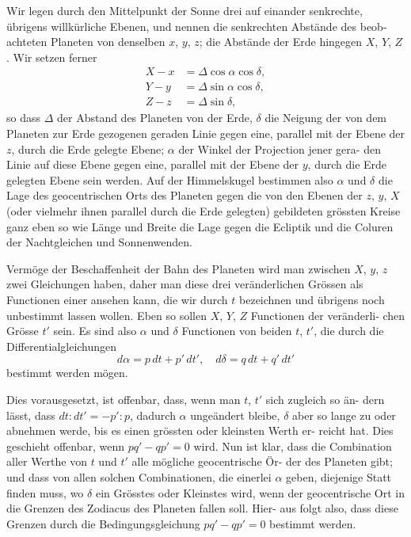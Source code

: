 \documentclass[12pt,a4paper]{article}
\begin{document}
Wir legen durch den Mittelpunkt der Sonne drei auf einander senkrechte,
übrigens willkürliche Ebenen, und nennen die senkrechten Abstände des beob-
achteten Planeten von denselben $x$, $y$, $z$; die Abstände der Erde hingegen
$X$, $Y$, $Z$. Wir setzen ferner
\begin{align*}
X - x &= \Delta\cos\alpha\cos\delta,\\
Y - y &= \Delta\sin\alpha\cos\delta,\\
Z - z &= \Delta\sin\delta,
\end{align*}
so dass $\Delta$ der Abstand des Planeten von der Erde, $\delta$ die Neigung der von dem
Planeten zur Erde gezogenen geraden Linie gegen eine, parallel mit der Ebene
der $z$, durch die Erde gelegte Ebene; $\alpha$ der Winkel der Projection jener gera-
den Linie auf diese Ebene gegen eine, parallel mit der Ebene der $y$, durch die
Erde gelegten Ebene sein werden. Auf der Himmelskugel bestimmen also $\alpha$ und
$\delta$ die Lage des geocentrischen Orts des Planeten gegen die von den Ebenen der
$z$, $y$, $X$ (oder vielmehr ihnen parallel durch die Erde gelegten) gebildeten grössten
Kreise ganz eben so wie Länge und Breite die Lage gegen die Ecliptik und die
Coluren der Nachtgleichen und Sonnenwenden.

Vermöge der Beschaffenheit der Bahn des Planeten wird man zwischen
$X$, $y$, $z$ zwei Gleichungen haben, daher man diese drei veränderlichen Grössen
als Functionen einer ansehen kann, die wir durch $t$ bezeichnen und übrigens
noch unbestimmt lassen wollen. Eben so sollen $X$, $Y$, $Z$ Functionen der veränderli-
chen Grösse $t'$ sein. Es sind also $\alpha$ und $\delta$ Functionen von beiden $t$, $t'$, die
durch die Differentialgleichungen
\[
d\alpha = p\,dt + p'\,dt',\quad d\delta = q\,dt + q'\,dt'
\]
bestimmt werden mögen.

Dies vorausgesetzt, ist offenbar, dass, wenn man $t$, $t'$ sich zugleich so än-
dern lässt, dass $dt : dt' = -p' : p$, dadurch $\alpha$ ungeändert bleibe, $\delta$ aber so
lange zu oder abnehmen werde, bis es einen grössten oder kleinsten Werth er-
reicht hat. Dies geschieht offenbar, wenn $pq' - qp' = 0$ wird. Nun ist klar,
dass die Combination aller Werthe von $t$ und $t'$ alle mögliche geocentrische Ör-
der des Planeten gibt; und dass von allen solchen Combinationen, die einerlei $\alpha$
geben, diejenige Statt finden muss, wo $\delta$ ein Grösstes oder Kleinstes wird, wenn
der geocentrische Ort in die Grenzen des Zodiacus des Planeten fallen soll. Hier-
aus folgt also, dass diese Grenzen durch die Bedingungsgleichung $pq' - qp' = 0$
bestimmt werden.
\end{document}
